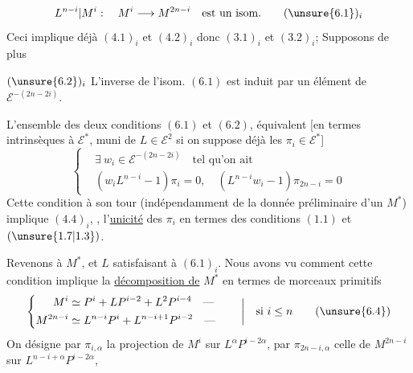 \[
L^{n-i}|M^i:\quad M^i\longrightarrow M^{2n-i}\quad\text{est un isom.}
\tag*{$(\unsure{6.1})_i$}
\]
Ceci implique déjà $(4.1)_i$ et $(4.2)_i$ donc $(3.1)_i$ et $(3.2)_i$;  Supposons de plus

$(\unsure{6.2})_i$ L'inverse de l'isom. $(6.1)$ est  induit par un élément de $\mathcal E^{-(2n-2i)}$.

 L'ensemble des deux conditions $(6.1)$ et $(6.2)$, équivalent [en termes intrinsèques à $\mathcal E^*$, muni de $L\in\mathcal E^2$ si on suppose déjà les $\pi_i\in\mathcal E^*$]
\[
\left\{\begin{aligned}
&\exists\ w_i\in\mathcal E^{-(2n-2i)}\quad\text{tel qu'on ait}\\
&(w_iL^{n-i}-1)\pi_i=0,\quad(L^{n-i}w_i-1)\pi_{2n-i}=0
\end{aligned}\right.
\tag*{$(6.3.)_i$}
\]
Cette condition à son tour (indépendamment de la donnée préliminaire d'un $M^*$) implique $(4.4)_i$, ,  l'\uline{unicité} des $\pi_i$ en termes des conditions $(1.1)$ et $(\unsure{1.7|1.3})$.

Revenons à $M^*$, et $L$ satisfaisant à $(6.1)_i$. Nous avons vu comment  cette condition implique la \uline{décomposition de} $M^*$ en termes  de morceaux primitifs
\[
\left\{\begin{aligned}
M^i&\simeq P^i+LP^{i-2}+L^2P^{i-4}\quad\text{---}\\
M^{2n-i}&\simeq L^{n-i}P^i+L^{n-i+1}P^{i-2}\quad\text{---}
\end{aligned}\right.\qquad\bigg|\quad\text{si }i\leq n
\tag{\unsure{6.4}}
\]
On désigne par $\pi_{i,\alpha}$ la projection de $M^i$ sur $L^\alpha P^{i-2\alpha}$, par $\pi_{2n-i,\alpha}$ celle de $M^{2n-i}$ sur $L^{n-i+\alpha}P^{i-2\alpha}$,

